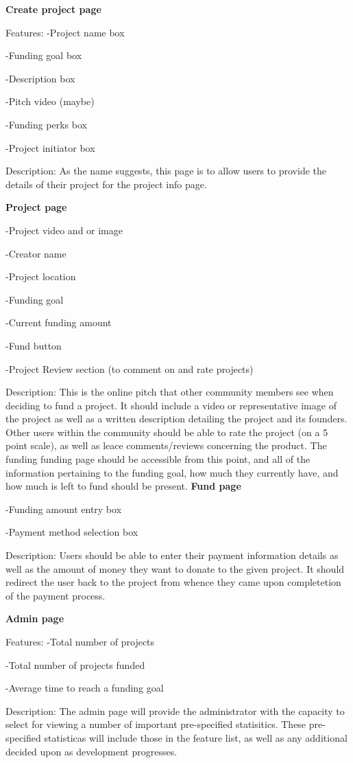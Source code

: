 \documentclass[12pt]{article}
\begin{document}
\begin{enumerate}
\textbf{Create project page}

Features:
-Project name box

-Funding goal box

-Description box

-Pitch video (maybe)

-Funding perks box

-Project initiator  box

Description:
As the name suggests, this page is to allow users to provide the details of their project for the project info page.

\textbf{Project page}

-Project video and or image

-Creator name

-Project location

-Funding goal

-Current funding amount

-Fund button

-Project Review section (to comment on and rate projects)

Description:
This is the online pitch that other community members see when deciding to fund a project.
It should include a video or representative image of the project as well as a written description detailing the 
project and its founders.
Other users within the community should be able to rate the project (on a 5 point scale), as well as leace comments/reviews
concerning the product. The funding funding page should be accessible from this point, and all of the information pertaining
to the funding goal, how much they currently have, and how much is left to fund should be present.
\textbf{Fund page}

-Funding amount entry box

-Payment method selection box

Description:
Users should be able to enter their payment information details as well as the amount of money they want to donate to
the given project.
It should redirect the user back to the project from whence they came upon completetion of the payment process.

\textbf{Admin page}

Features:
-Total number of projects

-Total number of projects funded

-Average time to reach a funding goal

Description:
The admin page will provide the administrator with the capacity to select for viewing a number of important pre-specified statisitics.
These pre-specified statisticas will include those in the feature list, as well as any additional decided upon as development progresses.



\end{enumerate}
\end{document}

